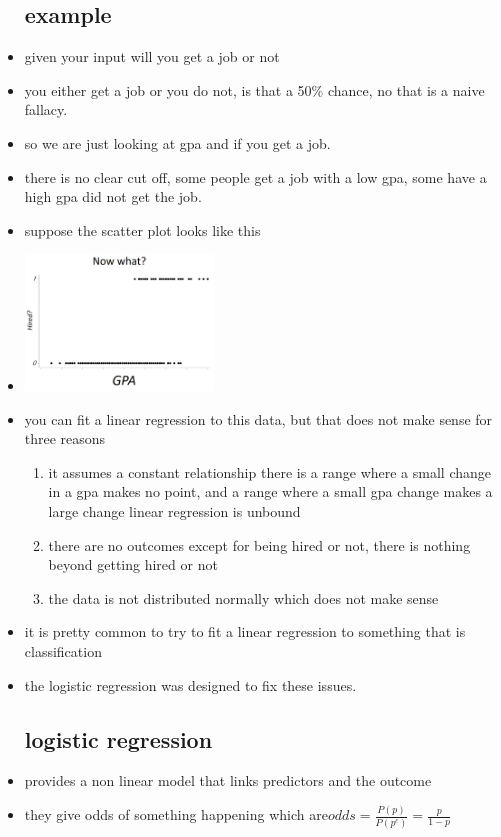 \documentclass{article}
\begin{document}
\begin{itemize}
\subsection{example}
\item given your input will you get a job or not 
\item you either get a job or you do not, is that a 50\% chance, no that is a naive fallacy.
\item so we are just looking at gpa and if you get a job. 
\item there is no clear cut off, some people get a job with a low gpa, some have a high gpa did not get the job.
\item suppose the scatter plot looks like this 
\item \includegraphics[width=5cm]{Final_Review/lecture_10/logistic_reg.jpg}
\item you can fit a linear regression to this data, but that does not make sense for three reasons 
\begin{enumerate}
    \item it assumes a constant relationship there is a range where a small change in a gpa makes no point, and a range where a small gpa change makes a large change 
    linear regression is unbound 
    \item there are no outcomes except for being hired or not, there is nothing beyond getting hired  or not 
    \item the data is not distributed normally which does not make sense

    
\end{enumerate}
\item it is pretty common to try to fit a linear regression to something that is classification 
\item the logistic regression was designed to fix these issues. 
\subsection{logistic regression}
\item provides a non linear model that links predictors and the outcome 
\item they give odds of something happening which are$odds=\frac{P(p)}{P(p^c)}=\frac{p}{1-p}$

\end{itemize}
\end{document}
